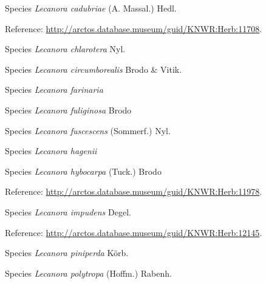 \documentclass[9pt, article]{memoir}
\begin{document}
\begin{multicols}{2}
\vspace{6pt}\noindent\hspace{36pt}Species \textit{Lecanora cadubriae} (A. Massal.) Hedl.


\vspace{6pt}Reference: 
\url{http://arctos.database.museum/guid/KNWR:Herb:11708}.

\vspace{6pt}\noindent\hspace{36pt}Species \textit{Lecanora chlarotera} Nyl.


\vspace{6pt}\noindent\hspace{36pt}Species \textit{Lecanora circumborealis} Brodo \& Vitik.


\vspace{6pt}\noindent\hspace{36pt}Species \textit{Lecanora farinaria}


\vspace{6pt}\noindent\hspace{36pt}Species \textit{Lecanora fuliginosa} Brodo


\vspace{6pt}\noindent\hspace{36pt}Species \textit{Lecanora fuscescens} (Sommerf.) Nyl.


\vspace{6pt}\noindent\hspace{36pt}Species \textit{Lecanora hagenii}


\vspace{6pt}\noindent\hspace{36pt}Species \textit{Lecanora hybocarpa} (Tuck.) Brodo


\vspace{6pt}Reference: 
\url{http://arctos.database.museum/guid/KNWR:Herb:11978}.

\vspace{6pt}\noindent\hspace{36pt}Species \textit{Lecanora impudens} Degel.


\vspace{6pt}Reference: 
\url{http://arctos.database.museum/guid/KNWR:Herb:12145}.

\vspace{6pt}\noindent\hspace{36pt}Species \textit{Lecanora piniperda} Körb.


\vspace{6pt}\noindent\hspace{36pt}Species \textit{Lecanora polytropa} (Hoffm.) Rabenh.



\end{multicols}
\end{document}
